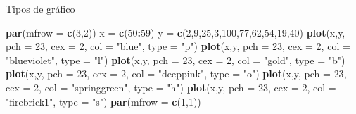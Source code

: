 \documentclass[
  ignorenonframetext,
  aspectratio=169]{beamer}
\newenvironment{Shaded}{\begin{snugshade}}{\end{snugshade}}
\newcommand{\AttributeTok}[1]{\textcolor[rgb]{0.13,0.29,0.53}{#1}}
\newcommand{\DecValTok}[1]{\textcolor[rgb]{0.00,0.00,0.81}{#1}}
\newcommand{\FunctionTok}[1]{\textcolor[rgb]{0.13,0.29,0.53}{\textbf{#1}}}
\newcommand{\NormalTok}[1]{#1}
\newcommand{\OtherTok}[1]{\textcolor[rgb]{0.56,0.35,0.01}{#1}}
\newcommand{\SpecialCharTok}[1]{\textcolor[rgb]{0.81,0.36,0.00}{\textbf{#1}}}
\newcommand{\StringTok}[1]{\textcolor[rgb]{0.31,0.60,0.02}{#1}}
\begin{document}
\begin{frame}[fragile]{Tipos de gráfico}
\label{tipos-de-gruxe1fico}
\begin{Shaded}
\begin{Highlighting}[]
\FunctionTok{par}\NormalTok{(}\AttributeTok{mfrow =} \FunctionTok{c}\NormalTok{(}\DecValTok{3}\NormalTok{,}\DecValTok{2}\NormalTok{))}
\NormalTok{x }\OtherTok{=} \FunctionTok{c}\NormalTok{(}\DecValTok{50}\SpecialCharTok{:}\DecValTok{59}\NormalTok{)}
\NormalTok{y }\OtherTok{=} \FunctionTok{c}\NormalTok{(}\DecValTok{2}\NormalTok{,}\DecValTok{9}\NormalTok{,}\DecValTok{25}\NormalTok{,}\DecValTok{3}\NormalTok{,}\DecValTok{100}\NormalTok{,}\DecValTok{77}\NormalTok{,}\DecValTok{62}\NormalTok{,}\DecValTok{54}\NormalTok{,}\DecValTok{19}\NormalTok{,}\DecValTok{40}\NormalTok{)}
\FunctionTok{plot}\NormalTok{(x,y, }\AttributeTok{pch =} \DecValTok{23}\NormalTok{, }\AttributeTok{cex =} \DecValTok{2}\NormalTok{, }\AttributeTok{col =} \StringTok{"blue"}\NormalTok{, }\AttributeTok{type =} \StringTok{"p"}\NormalTok{)}
\FunctionTok{plot}\NormalTok{(x,y, }\AttributeTok{pch =} \DecValTok{23}\NormalTok{, }\AttributeTok{cex =} \DecValTok{2}\NormalTok{, }\AttributeTok{col =} \StringTok{"blueviolet"}\NormalTok{, }\AttributeTok{type =} \StringTok{"l"}\NormalTok{)}
\FunctionTok{plot}\NormalTok{(x,y, }\AttributeTok{pch =} \DecValTok{23}\NormalTok{, }\AttributeTok{cex =} \DecValTok{2}\NormalTok{, }\AttributeTok{col =} \StringTok{"gold"}\NormalTok{, }\AttributeTok{type =} \StringTok{"b"}\NormalTok{)}
\FunctionTok{plot}\NormalTok{(x,y, }\AttributeTok{pch =} \DecValTok{23}\NormalTok{, }\AttributeTok{cex =} \DecValTok{2}\NormalTok{, }\AttributeTok{col =} \StringTok{"deeppink"}\NormalTok{, }\AttributeTok{type =} \StringTok{"o"}\NormalTok{)}
\FunctionTok{plot}\NormalTok{(x,y, }\AttributeTok{pch =} \DecValTok{23}\NormalTok{, }\AttributeTok{cex =} \DecValTok{2}\NormalTok{, }\AttributeTok{col =} \StringTok{"springgreen"}\NormalTok{,}
     \AttributeTok{type =} \StringTok{"h"}\NormalTok{)}
\FunctionTok{plot}\NormalTok{(x,y, }\AttributeTok{pch =} \DecValTok{23}\NormalTok{, }\AttributeTok{cex =} \DecValTok{2}\NormalTok{, }\AttributeTok{col =} \StringTok{"firebrick1"}\NormalTok{,}
     \AttributeTok{type =} \StringTok{"s"}\NormalTok{)}
\FunctionTok{par}\NormalTok{(}\AttributeTok{mfrow =} \FunctionTok{c}\NormalTok{(}\DecValTok{1}\NormalTok{,}\DecValTok{1}\NormalTok{))}
\end{Highlighting}
\end{Shaded}
\end{frame}
\end{document}
